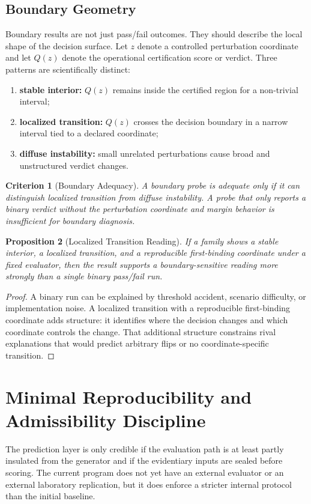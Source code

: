 \documentclass[11pt,a4paper]{article}
\newtheorem{proposition}{Proposition}[section]
\newtheorem{criterion}[proposition]{Criterion}
\begin{document}
\subsection{Boundary Geometry}
Boundary results are not just pass/fail outcomes. They should describe the local
shape of the decision surface. Let $z$ denote a controlled perturbation coordinate
and let $Q(z)$ denote the operational certification score or verdict. Three
patterns are scientifically distinct:
\begin{enumerate}[leftmargin=1.5em]
\item \textbf{stable interior:} $Q(z)$ remains inside the certified region for a
non-trivial interval;
\item \textbf{localized transition:} $Q(z)$ crosses the decision boundary in a
narrow interval tied to a declared coordinate;
\item \textbf{diffuse instability:} small unrelated perturbations cause broad and
unstructured verdict changes.
\end{enumerate}

\begin{criterion}[Boundary Adequacy]
A boundary probe is adequate only if it can distinguish localized transition from
diffuse instability. A probe that only reports a binary verdict without the
perturbation coordinate and margin behavior is insufficient for boundary
diagnosis.
\end{criterion}

\begin{proposition}[Localized Transition Reading]
If a family shows a stable interior, a localized transition, and a reproducible
first-binding coordinate under a fixed evaluator, then the result supports a
boundary-sensitive reading more strongly than a single binary pass/fail run.
\end{proposition}

\begin{proof}
A binary run can be explained by threshold accident, scenario difficulty, or
implementation noise. A localized transition with a reproducible first-binding
coordinate adds structure: it identifies where the decision changes and which
coordinate controls the change. That additional structure constrains rival
explanations that would predict arbitrary flips or no coordinate-specific
transition.
\end{proof}

\section{Minimal Reproducibility and Admissibility Discipline}
The prediction layer is only credible if the evaluation path is at least partly insulated from the generator and if the evidentiary inputs are sealed before scoring. The current program does not yet have an external evaluator or an external laboratory replication, but it does enforce a stricter internal protocol than the initial baseline.
\end{document}
